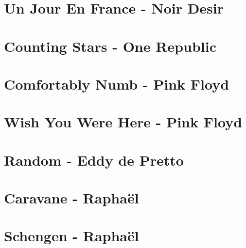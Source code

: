 \documentclass{guitartabs}
\begin{document}
\section*{Un Jour En France - Noir Desir}
\begin{guitar}

\end{guitar}

\section{Counting Stars - One Republic}
\begin{guitar}

\end{guitar}

\section{Comfortably Numb - Pink Floyd}
\begin{guitar}

\end{guitar}

\section{Wish You Were Here - Pink Floyd}
\begin{guitar}

\end{guitar}



\section{Random - Eddy de Pretto}
\begin{guitar}

\end{guitar}

\section{Caravane - Raphaël}
\begin{guitar}

\end{guitar}

\section{Schengen - Raphaël}
\begin{guitar}

\end{guitar}
\end{document}
